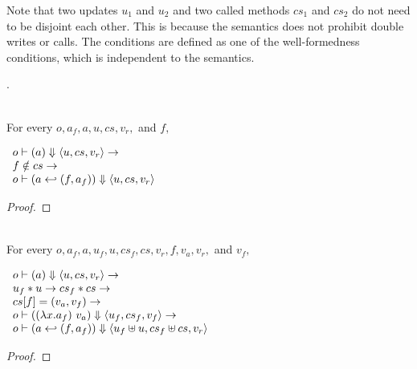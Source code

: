 Note that two updates $u_1$ and $u_2$ and two called methods $cs_1$
and $cs_2$ do not need to be disjoint each other. This is because the
semantics does not prohibit double writes or calls. The conditions are
defined as one of the well-formedness conditions, which is independent
to the semantics.

.

\begin{lemma}
  \label{lem-inlinedm-action-intact}
  \mbox{}\\
  For every $o, a_f, a, u, cs, v_r,$ and $f,$
  \begin{center}
    \begin{math}
      \begin{array}{l}
        o |- (a) \Downarrow \langle u, cs, v_r \rangle \to \\
        f \notin cs \to \\
        o |- (a \hookleftarrow{} (f, a_f)) \Downarrow \langle u, cs, v_r \rangle
      \end{array}
    \end{math}
  \end{center}
\end{lemma}
\begin{proof}
\end{proof}

\begin{lemma}
  \label{lem-inlinedm-action-call}
  \mbox{}\\
  For every $o, a_f, a, u_f, u, cs_f, cs, v_r, f, v_a, v_r,$ and $v_f,$
  \begin{center}
    \begin{math}
      \begin{array}{l}
        o |- (a) \Downarrow \langle u, cs, v_r \rangle \to \\
        u_f \ast u \to cs_f \ast cs \to \\
        cs[f] = (v_a, v_f) \to \\
        o |- ((\lambda x.a_f)\ v_a) \Downarrow \langle u_f, cs_f, v_f \rangle \to \\
        o |- (a \hookleftarrow{} (f, a_f)) \Downarrow \langle u_f \uplus u, cs_f \uplus cs, v_r \rangle
      \end{array}
    \end{math}
  \end{center}
\end{lemma}
\begin{proof}
\end{proof}

